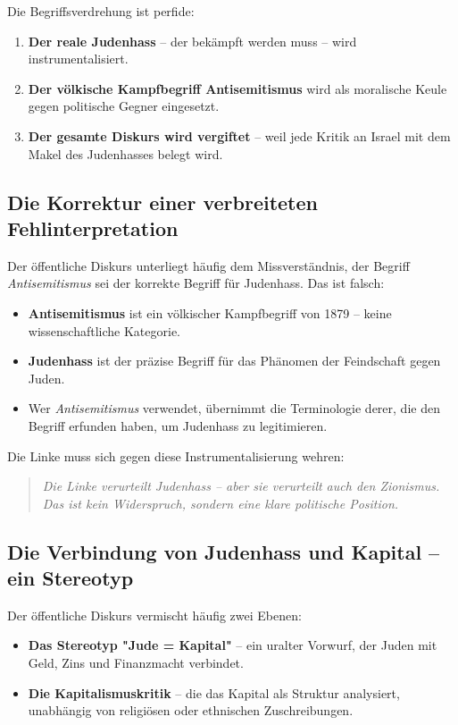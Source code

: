 Die Begriffsverdrehung ist perfide:

\begin{enumerate}
    \item \textbf{Der reale Judenhass} – der bekämpft werden muss – wird instrumentalisiert.
    \item \textbf{Der völkische Kampfbegriff Antisemitismus} wird als moralische Keule gegen politische Gegner eingesetzt.
    \item \textbf{Der gesamte Diskurs wird vergiftet} – weil jede Kritik an Israel mit dem Makel des Judenhasses belegt wird.
\end{enumerate}

\subsection{Die Korrektur einer verbreiteten Fehlinterpretation}

Der öffentliche Diskurs unterliegt häufig dem Missverständnis, der Begriff \emph{Antisemitismus} sei der korrekte Begriff für Judenhass. Das ist falsch:

\begin{itemize}
    \item \textbf{Antisemitismus} ist ein völkischer Kampfbegriff von 1879 – keine wissenschaftliche Kategorie.
    \item \textbf{Judenhass} ist der präzise Begriff für das Phänomen der Feindschaft gegen Juden.
    \item Wer \emph{Antisemitismus} verwendet, übernimmt die Terminologie derer, die den Begriff erfunden haben, um Judenhass zu legitimieren.
\end{itemize}

Die Linke muss sich gegen diese Instrumentalisierung wehren:

\begin{quote}
\emph{Die Linke verurteilt Judenhass – aber sie verurteilt auch den Zionismus. Das ist kein Widerspruch, sondern eine klare politische Position.}
\end{quote}

\subsection{Die Verbindung von Judenhass und Kapital – ein Stereotyp}

Der öffentliche Diskurs vermischt häufig zwei Ebenen:

\begin{itemize}
    \item \textbf{Das Stereotyp "Jude = Kapital"} – ein uralter Vorwurf, der Juden mit Geld, Zins und Finanzmacht verbindet.
    \item \textbf{Die Kapitalismuskritik} – die das Kapital als Struktur analysiert, unabhängig von religiösen oder ethnischen Zuschreibungen.
\end{itemize}

